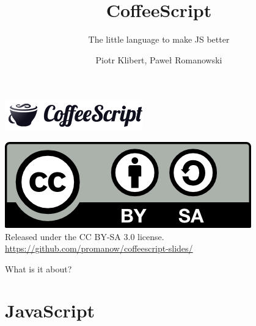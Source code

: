\documentclass[xcolor=dvipsnames]{beamer}
\title{CoffeeScript}
\subtitle{The little language to make JS better}
\author{Piotr Klibert, Paweł Romanowski}
\begin{document}
\begin{frame}[plain]
    \begin{center}
        \includegraphics[scale=0.25]{img/logo.png}
    \end{center}

    \titlepage

    \begin{center}
        \includegraphics[scale=0.5]{img/cc.png} \\
        Released under the CC BY-SA 3.0 license. \\
        \vspace{0.5cm}
        \url{https://github.com/promanow/coffeescript-slides/}
    \end{center}

\end{frame}

\begin{frame}{What is it about?}
    \tableofcontents
\end{frame}



\section{JavaScript}
\end{document}
